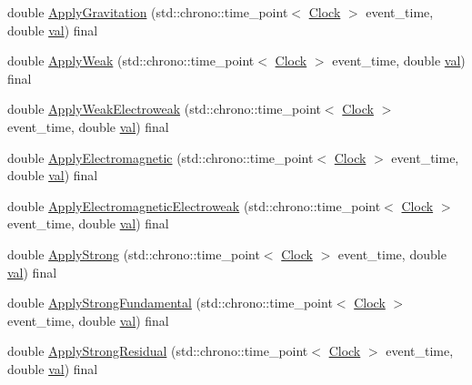 \begin{DoxyCompactItemize}
\item 
double \mbox{\hyperlink{class_dimension_a9474b0dd3f6321a92bfe4375bb4b2266}{Apply\+Gravitation}} (std\+::chrono\+::time\+\_\+point$<$ \mbox{\hyperlink{universe_8h_a0ef8d951d1ca5ab3cfaf7ab4c7a6fd80}{Clock}} $>$ event\+\_\+time, double \mbox{\hyperlink{glad_8h_a26942fd2ed566ef553eae82d2c109c8f}{val}}) final
\item 
double \mbox{\hyperlink{class_dimension_a72b8ab8d676b4df6b9a6ef948f5693c9}{Apply\+Weak}} (std\+::chrono\+::time\+\_\+point$<$ \mbox{\hyperlink{universe_8h_a0ef8d951d1ca5ab3cfaf7ab4c7a6fd80}{Clock}} $>$ event\+\_\+time, double \mbox{\hyperlink{glad_8h_a26942fd2ed566ef553eae82d2c109c8f}{val}}) final
\item 
double \mbox{\hyperlink{class_dimension_abf490cabd486afa660f17940ed0d17e6}{Apply\+Weak\+Electroweak}} (std\+::chrono\+::time\+\_\+point$<$ \mbox{\hyperlink{universe_8h_a0ef8d951d1ca5ab3cfaf7ab4c7a6fd80}{Clock}} $>$ event\+\_\+time, double \mbox{\hyperlink{glad_8h_a26942fd2ed566ef553eae82d2c109c8f}{val}}) final
\item 
double \mbox{\hyperlink{class_dimension_a65bcd3c09792cf53b1f614eff49cf111}{Apply\+Electromagnetic}} (std\+::chrono\+::time\+\_\+point$<$ \mbox{\hyperlink{universe_8h_a0ef8d951d1ca5ab3cfaf7ab4c7a6fd80}{Clock}} $>$ event\+\_\+time, double \mbox{\hyperlink{glad_8h_a26942fd2ed566ef553eae82d2c109c8f}{val}}) final
\item 
double \mbox{\hyperlink{class_dimension_ab13e8ed50a4373274636e542c917db01}{Apply\+Electromagnetic\+Electroweak}} (std\+::chrono\+::time\+\_\+point$<$ \mbox{\hyperlink{universe_8h_a0ef8d951d1ca5ab3cfaf7ab4c7a6fd80}{Clock}} $>$ event\+\_\+time, double \mbox{\hyperlink{glad_8h_a26942fd2ed566ef553eae82d2c109c8f}{val}}) final
\item 
double \mbox{\hyperlink{class_dimension_a621e8f7f24db86e836c5b3da0f019290}{Apply\+Strong}} (std\+::chrono\+::time\+\_\+point$<$ \mbox{\hyperlink{universe_8h_a0ef8d951d1ca5ab3cfaf7ab4c7a6fd80}{Clock}} $>$ event\+\_\+time, double \mbox{\hyperlink{glad_8h_a26942fd2ed566ef553eae82d2c109c8f}{val}}) final
\item 
double \mbox{\hyperlink{class_dimension_afb01fb9e469da18899d4b14e5f095ece}{Apply\+Strong\+Fundamental}} (std\+::chrono\+::time\+\_\+point$<$ \mbox{\hyperlink{universe_8h_a0ef8d951d1ca5ab3cfaf7ab4c7a6fd80}{Clock}} $>$ event\+\_\+time, double \mbox{\hyperlink{glad_8h_a26942fd2ed566ef553eae82d2c109c8f}{val}}) final
\item 
double \mbox{\hyperlink{class_dimension_a2ae0b6a8ee17f6e28b6d2d3209df4bf4}{Apply\+Strong\+Residual}} (std\+::chrono\+::time\+\_\+point$<$ \mbox{\hyperlink{universe_8h_a0ef8d951d1ca5ab3cfaf7ab4c7a6fd80}{Clock}} $>$ event\+\_\+time, double \mbox{\hyperlink{glad_8h_a26942fd2ed566ef553eae82d2c109c8f}{val}}) final

\end{DoxyCompactItemize}
